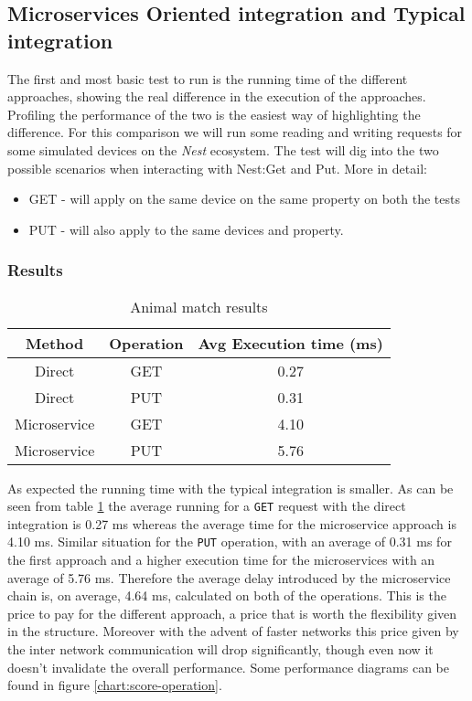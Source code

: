 \subsection{Microservices Oriented integration and Typical integration}

The first and most basic test to run is the running time of the different approaches,
showing the real difference in the execution of the approaches. Profiling the performance
of the two is the easiest way of highlighting the difference.\newline
For this comparison we will run some reading and writing requests for some simulated devices
on the \textit{Nest} ecosystem. The test will dig into the two possible scenarios when interacting with
Nest:Get and Put. More in detail:

\begin{itemize}
    \item GET - will apply on the same device on the same property on both the tests
    \item PUT - will also apply to the same devices and property.
\end{itemize}

\subsubsection{Results}

\begin{table}

\centering
\caption{Animal match results}
\label{tab:nestbasic}
\begin{tabular}{|c|c|c|} \hline
\textbf{Method} &  \textbf{Operation} & \textbf{Avg Execution time (ms)} \\ \hline
    Direct & GET & 0.27 \\ \hline
    Direct & PUT & 0.31 \\ \hline
    Microservice & GET & 4.10 \\ \hline
    Microservice & PUT & 5.76 \\ \hline
\end{tabular}
\end{table}

As expected the running time with the typical integration is smaller. As can be seen
from table \ref{tab:nestbasic} the average running for a \texttt{GET} request with the direct integration is 0.27 ms whereas the average time for
the microservice approach is 4.10 ms. Similar situation for the \texttt{PUT} operation, with an average of 0.31 ms for the first approach and a higher
execution time for the microservices with an average of 5.76 ms.
Therefore the average delay introduced by the microservice chain is,
on average, 4.64 ms, calculated on both of the operations. This is the price to pay for the different approach, a price that is worth the flexibility
given in the structure. Moreover with the advent of faster networks this price given by the inter network communication will drop
significantly, though even now it doesn't invalidate the overall performance. Some performance diagrams can be found in figure \ref{chart:score-operation}.

